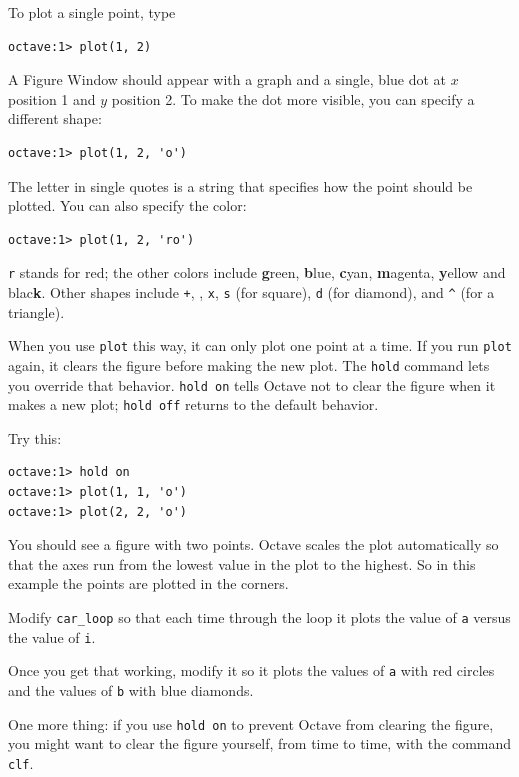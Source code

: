 \documentclass{book}
\begin{document}
To plot a single point, type

\begin{verbatim}
octave:1> plot(1, 2)
\end{verbatim}

A {\sf Figure Window} should appear with a graph and a single, blue dot
at $x$ position 1 and $y$ position 2. To make the dot more visible,
you can specify a different shape:

\begin{verbatim}
octave:1> plot(1, 2, 'o')
\end{verbatim}

The letter in single quotes is a string that specifies how the
point should be plotted. You can also specify the color:

\begin{verbatim}
octave:1> plot(1, 2, 'ro')
\end{verbatim}

{\tt r} stands for red; the other colors include {\bf g}reen, {\bf
b}lue, {\bf c}yan, {\bf m}agenta, {\bf y}ellow and blac{\bf k}.
Other shapes include {\tt +}, 
{\tt *}, 
{\tt x}, 
{\tt s} (for square), 
{\tt d} (for diamond), and 
\verb+^+ (for a triangle). 

When you use {\tt plot} this way, it can only plot one point at a
time. If you run {\tt plot} again, it clears the figure before making
the new plot. The {\tt hold} command lets you override that behavior.
{\tt hold on} tells Octave not to clear the figure when it makes a new
plot; {\tt hold off} returns to the default behavior.

Try this:

\begin{verbatim}
octave:1> hold on
octave:1> plot(1, 1, 'o')
octave:1> plot(2, 2, 'o')
\end{verbatim}

You should see a figure with two points. Octave scales
the plot automatically so that the axes run from the lowest value in
the plot to the highest. So in this example the points are plotted in
the corners.

\begin{ex}
Modify {\tt car\_loop} so that each time through the
loop it plots the value of {\tt a} versus the value of {\tt i}.

Once you get that working, modify it so it plots the values of {\tt a}
with red circles and the values of {\tt b} with blue diamonds.

One more thing: if you use {\tt hold on} to prevent Octave from
clearing the figure, you might want to clear the figure yourself,
from time to time, with the command {\tt clf}.
\end{ex}
\end{document}
